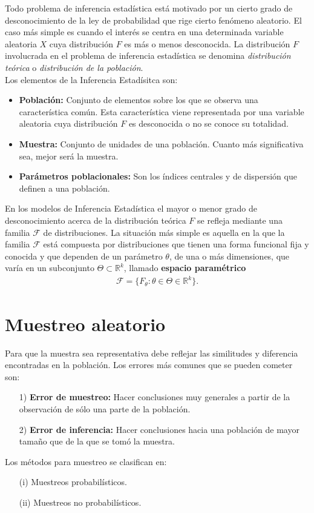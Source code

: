 Todo problema de inferencia estadística está motivado por un cierto grado de desconocimiento de la ley de probabilidad que rige cierto fenómeno aleatorio. El caso más simple es cuando el interés se centra en una determinada variable aleatoria $X$ cuya distribución $F$ es más o menos desconocida. La distribución $F$ involucrada en el problema de inferencia estadística se denomina \textit{distribución teórica} o \textit{distribución de la población}.
\\
\newline
Los elementos de la Inferencia Estadísitca son:
\begin{itemize}
    \item \textbf{Población:} Conjunto de elementos sobre los que se observa una característica común. Esta característica viene representada por una variable aleatoria cuya distribución $F$ es desconocida o no se conoce su totalidad.
    \item \textbf{Muestra:} Conjunto de unidades de una población. Cuanto más significativa sea, mejor será la muestra.
    \item \textbf{Parámetros poblacionales:} Son los índices centrales y de dispersión que definen a una población.
\end{itemize}
En los modelos de Inferencia Estadística el mayor o menor grado de desconocimiento acerca de la distribución teórica $F$ se refleja mediante una familia $\mathcal{F}$ de distribuciones. La situación más simple es aquella en la que la familia $\mathcal{F}$ está compuesta por distribuciones que tienen una forma funcional fija y conocida y que dependen de un parámetro $\theta$, de una o más dimensiones, que varía en un subconjunto $\Theta \subset \mathbb{R}^k$, llamado \textbf{espacio paramétrico}
\begin{align*}
    \mathcal{F} = \{ F_{\theta} : \theta \in \Theta \in \mathbb{R}^k \}.
\end{align*}

\section{Muestreo aleatorio}
Para que la muestra sea representativa debe reflejar las similitudes y diferencia encontradas en la población. Los errores más comunes que se pueden cometer son:
\begin{enumerate}
    \item[1)] \textbf{Error de muestreo:} Hacer conclusiones muy generales a partir de la observación de sólo una parte de la población.
    \item[2)] \textbf{Error de inferencia:} Hacer conclusiones hacia una población de mayor tamaño que de la que se tomó la muestra.
\end{enumerate}
Los métodos para muestreo se clasifican en:
\begin{enumerate}
    \item[(i)] Muestreos probabilísticos.
    \item[(ii)] Muestreos no probabilísticos.
\end{enumerate}

